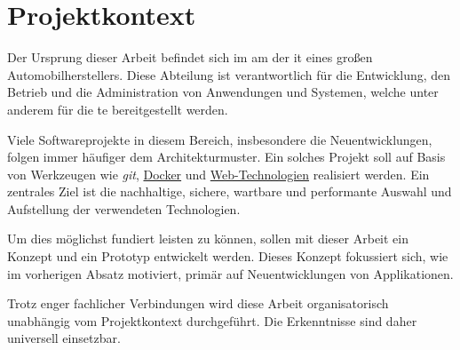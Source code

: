 \section{Projektkontext}
\label{sec:01-02_project-context}

Der Ursprung dieser Arbeit befindet sich im \Gls{am} der \Gls{it} eines großen Automobilherstellers. Diese Abteilung ist verantwortlich für die Entwicklung, den Betrieb und die Administration von Anwendungen und Systemen, welche unter anderem für die \Gls{te} bereitgestellt werden.

Viele Softwareprojekte in diesem Bereich, insbesondere die Neuentwicklungen, folgen immer häufiger dem  Architekturmuster. Ein solches Projekt soll auf Basis von Werkzeugen wie \textit{\Gls{git}}, \hyperref[sec:02-03_containerization]{Docker} und \hyperref[sec:02-01_web-development]{Web-Technologien} realisiert werden. Ein zentrales Ziel ist die nachhaltige, sichere, wartbare und performante Auswahl und Aufstellung der verwendeten Technologien.

Um dies möglichst fundiert leisten zu können, sollen mit dieser Arbeit ein Konzept und ein Prototyp entwickelt werden. Dieses Konzept fokussiert sich, wie im vorherigen Absatz motiviert, primär auf Neuentwicklungen von Applikationen.

Trotz enger fachlicher Verbindungen wird diese Arbeit organisatorisch unabhängig vom Projektkontext durchgeführt. Die Erkenntnisse sind daher universell einsetzbar.
